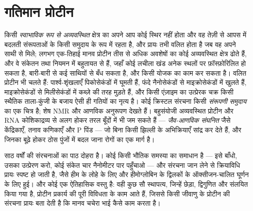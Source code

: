\section{गतिमान प्रोटीन}

\begin{definition}[अव्यवस्था और गतिकी]\label{def:b3:structural-biology:disorder}
किसी \emph{स्वाभाविक रूप से अव्यवस्थित} क्षेत्र का अपने आप कोई स्थिर
 नहीं होता और वह तेज़ी से आपस में बदलती संरूपताओं के किसी समुदाय के
रूप में रहता है, और प्रायः तभी वलित होता है जब वह अपने साथी से मिले;
लगभग एक-तिहाई मानव प्रोटीन तीस से अधिक अवशेषों का कोई अव्यवस्थित
क्षेत्र ढोते हैं, और वे संकेतन तथा नियमन में बहुतायत से हैं, जहाँ कोई
लचीला खंड अनेक स्थलों पर फ़ॉस्फ़ोरिलित हो सकता है, बारी-बारी से कई
साथियों से बँध सकता है, और किसी योजक का काम कर सकता है। वलित प्रोटीन भी
चलते हैं: पार्श्व-शृंखलाएँ पिकोसेकंडों में घूमती हैं, फंदे नैनोसेकंडों
से माइक्रोसेकंडों में खुलते हैं,  माइक्रोसेकंडों से
मिलीसेकंडों में कब्ज़े की तरह मुड़ते हैं, और किसी एंज़ाइम का उत्प्रेरक
चक्र किसी स्थैतिक ताला-कुंजी के बजाय ऐसी ही गतियों का नृत्य है। कोई
क्रिस्टल संरचना किसी \emph{संरूपणी समुदाय} का एक चित्र है; शेष NMR और
आणविक अनुरूपण देखते हैं। बहुसंयोजी अव्यवस्थित प्रोटीन और RNA
कोशिकाद्रव्य से अलग होकर तरल बूँदों में भी जम सकते हैं ---
\emph{जैव-आणविक संघनित} जैसे केंद्रिकाएँ, तनाव कणिकाएँ और P पिंड ---
जो बिना किसी झिल्ली के अभिक्रियाएँ सांद्र कर देते हैं, और जिनका बूढ़े
होकर ठोस पुंजों में बदल जाना  रोगों का एक मार्ग है।
\end{definition}

\begin{remark}[संरचना और प्रकार्य]\label{rem:b3:structural-biology:sf}
साठ वर्षों की संरचनाओं का पाठ दोहरा है। कोई  किसी भौतिक समस्या का
समाधान है --- इसे बाँधो, उसका उत्प्रेरण करो, कोई संकेत चार नैनोमीटर पार
पहुँचाओ --- और संरचना जान लेने से क्रियाविधि प्रायः स्पष्ट हो जाती है,
जैसे हीम के लोहे के लिए और हीमोग्लोबिन के द्विलकों के ऑक्सीजन-चालित
घूर्णन के लिए हुई। और कोई  एक ऐतिहासिक वस्तु है: वही कुछ सौ
स्थापत्य, जिन्हें छेड़ा, द्विगुणित और संलयित किया गया है, प्रोटीन
प्रकार्य की पूरी विविधता के काम आते हैं, जिससे किसी जीवाणु के प्रोटीन
की संरचना प्रायः बता देती है कि मानव चचेरा भाई कैसे काम करता है।
\end{remark}

